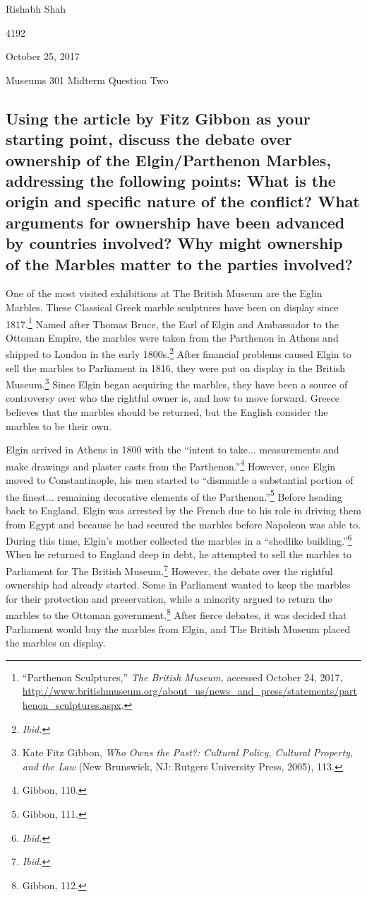 \documentclass[11pt]{article}
\begin{document}
\singlespacing
{\Large\noindent Rishabh Shah

 4192

\noindent October 25, 2017

\noindent Museums 301 Midterm Question Two}

\subsection*{Using the article by Fitz Gibbon as your starting point, discuss the debate over ownership of the Elgin/Parthenon Marbles, addressing the following points: What is the origin and specific nature of the conflict? What arguments for ownership have been advanced by countries involved? Why might ownership of the Marbles matter to the parties involved?}

\doublespacing
One of the most visited exhibitions at The British Museum are the Eglin Marbles. These Classical Greek marble sculptures have been on display since 1817.\footnote{``Parthenon Sculptures,'' \textit{The British Museum,} accessed October 24, 2017, \url{http://www.britishmuseum.org/about_us/news_and_press/statements/parthenon_sculptures.aspx}.} Named after Thomas Bruce, the Earl of Elgin and Ambassador to the Ottoman Empire, the marbles were taken from the Parthenon in Athens and shipped to London in the early 1800s.\footnote{\textit{Ibid.}} After financial problems caused Elgin to sell the marbles to Parliament in 1816, they were put on display in the British Museum.\footnote{Kate Fitz Gibbon, \textit{Who Owns the Past?: Cultural Policy, Cultural Property, and the Law} (New Brunswick, NJ: Rutgers University Press, 2005), 113.} Since Elgin began acquiring the marbles, they have been a source of controversy over who the rightful owner is, and how to move forward. Greece believes that the marbles should be returned, but the English consider the marbles to be their own.

Elgin arrived in Athens in 1800 with the ``intent to take... measurements and make drawings and plaster casts from the Parthenon.''\footnote{Gibbon, 110.} However, once Elgin moved to Constantinople, his men started to ``dismantle a substantial portion of the finest... remaining decorative elements of the Parthenon.''\footnote{Gibbon, 111.} Before heading back to England, Elgin was arrested by the French due to his role in driving them from Egypt and because he had secured the marbles before Napoleon was able to. During this time, Elgin's mother collected the marbles in a ``shedlike building.''\footnote{\textit{Ibid.}} When he returned to England deep in debt, he attempted to sell the marbles to Parliament for The British Museum.\footnote{\textit{Ibid.}} However, the debate over the rightful ownership had already started. Some in Parliament wanted to keep the marbles for their protection and preservation, while a minority argued to return the marbles to the Ottoman government.\footnote{Gibbon, 112.} After fierce debates, it was decided that Parliament would buy the marbles from Elgin, and The British Museum placed the marbles on display.
\end{document}
